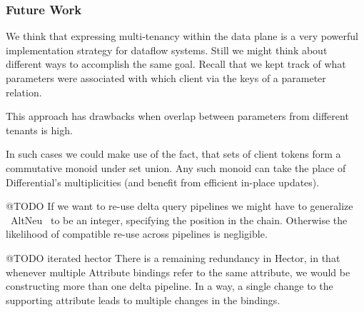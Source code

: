 \documentclass[../catalog.tex]{subfiles}
\begin{document}
\subsubsection{Future Work}

We think that expressing multi-tenancy within the data plane is a very
powerful implementation strategy for dataflow systems. Still we might
think about different ways to accomplish the same goal. Recall that we
kept track of what parameters were associated with which client via
the keys of a parameter relation.

This approach has drawbacks when overlap between parameters from
different tenants is high.

In such cases we could make use of the fact, that sets of client
tokens form a commutative monoid under set union. Any such monoid can
take the place of Differential's multiplicities (and benefit from
efficient in-place updates).

@TODO
If we want to re-use delta query pipelines we might have to generalize
~AltNeu~ to be an integer, specifying the position in the
chain. Otherwise the likelihood of compatible re-use across pipelines
is negligible.

@TODO iterated hector
There is a remaining redundancy in Hector, in that whenever multiple
Attribute bindings refer to the same attribute, we would be
constructing more than one delta pipeline. In a way, a single change
to the supporting attribute leads to multiple changes in the bindings.
\end{document}
